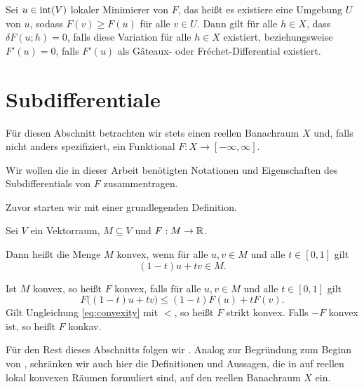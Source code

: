 \begin{theorem}
  \label{thm:necessaryConditionFreeLocalExtrema}
  Sei $u\in \operatorname{int}(V)$ lokaler Minimierer von $F$, das heißt
  es existiere eine Umgebung 
  $U$ von $u$, sodass $F(v)\geq F(u)$ für alle $v\in U$. Dann gilt für alle
  $h\in X$, dass $\delta F(u;h) = 0$, falls diese Variation für alle $h\in X$
  existiert, beziehungsweise $F'(u) = 0$, falls $F'(u)$ als 
  G\^ateaux- oder Fr\'echet-Differential existiert.
\end{theorem}

\section{Subdifferentiale}

Für diesen Abschnitt betrachten wir stets einen reellen Banachraum $X$ und,
falls nicht anders spezifiziert, ein Funktional $F:X\to [-\infty,\infty]$.

Wir wollen die in dieser Arbeit benötigten Notationen und
Eigenschaften des Subdifferentials von $F$ zusammentragen.

Zuvor starten wir mit einer grundlegenden Definition.

\begin{definition}
  Sei $V$ ein Vektorraum, $M\subseteq V$ und $F:M\to\mathbb{R}$. 
  
  Dann heißt die Menge $M$ konvex, wenn für alle $u,v\in M$ und alle $t\in
  [0,1]$ gilt $$(1-t)u+tv\in M.$$

  Ist $M$ konvex, so heißt $F$ konvex, falls für alle $u,v\in M$ und alle
  $t\in[0,1]$ gilt 
  \begin{equation}
    \label{eq:convexity}
    F\big( (1-t)u+tv\big)\leq (1-t)F(u)+t F(v).
  \end{equation}
  Gilt Ungleichung \eqref{eq:convexity} mit \glqq$<$\grqq, so heißt
  $F$ strikt konvex. Falls $-F$ konvex ist, so heißt $F$ konkav.
\end{definition}

Für den Rest dieses Abschnitts folgen wir \cite[S. 385-397]{Zei85}. 
Analog zur Begründung zum Beginn von , schränken
wir auch hier die Definitionen und Aussagen, die in \cite{Zei85} auf reellen
lokal konvexen Räumen formuliert sind, auf den reellen Banachraum $X$ ein.

